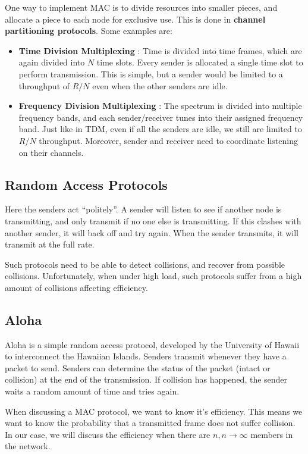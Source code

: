 \documentclass[12pt,letterpaper]{book}
\theoremstyle{definition}
\begin{document}
One way to implement MAC is to divide resources into smaller pieces, and allocate a piece to each node for exclusive use. This is done in \textbf{channel partitioning protocols}. Some examples are:
\begin{itemize}
  \item \textbf{Time Division Multiplexing} : Time is divided into time frames, which are again divided into $N$ time slots. Every sender is allocated a single time slot to perform transmission. This is simple, but a sender would be limited to a throughput of $R/N$ even when the other senders are idle.
  \item \textbf{Frequency Division Multiplexing}  : The spectrum is divided into multiple frequency bands, and each sender/receiver tunes into their assigned frequency band. Just like in TDM, even if all the senders are idle, we still are limited to $R/N$ throughput. Moreover, sender and receiver need to coordinate listening on their channels.
\end{itemize}

\subsection{Random Access Protocols}

Here the senders act ``politely''. A sender will listen to see if another node is transmitting, and only transmit if no one else is transmitting. If this clashes with another sender, it will back off and try again. When the sender transmits, it will transmit at the full rate.

Such protocols need to be able to detect collisions, and recover from possible collisions. Unfortunately, when under high load, such protocols suffer from a high amount of collisions affecting efficiency.

\subsection{Aloha}

Aloha is a simple random access protocol, developed by the University of Hawaii to interconnect the Hawaiian Islands. Senders transmit whenever they have a packet to send. Senders can determine the status of the packet (intact or collision) at the end of the transmission. If collision has happened, the sender waits a random amount of time and tries again.

When discussing a MAC protocol, we want to know it's efficiency. This means we want to know the probability that a transmitted frame does not suffer collision. In our case, we will discuss the efficiency when there are $n, n \rightarrow \infty$ members in the network.
\end{document}

